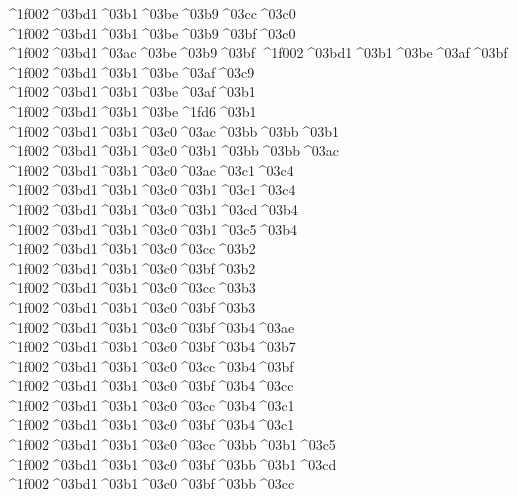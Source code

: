 {^^^^1f002^^^^03bd1^^^^03b1^^^^03be^^^^03b9^^^^03cc^^^^03c0  		%
^^^^1f002^^^^03bd1^^^^03b1^^^^03be^^^^03b9^^^^03bf^^^^03c0
^^^^1f002^^^^03bd1^^^^03ac^^^^03be^^^^03b9^^^^03bf 		%
^^^^1f002^^^^03bd1^^^^03b1^^^^03be^^^^03af^^^^03bf
^^^^1f002^^^^03bd1^^^^03b1^^^^03be^^^^03af^^^^03c9
^^^^1f002^^^^03bd1^^^^03b1^^^^03be^^^^03af^^^^03b1
^^^^1f002^^^^03bd1^^^^03b1^^^^03be^^^^1fd6^^^^03b1
^^^^1f002^^^^03bd1^^^^03b1^^^^03c0^^^^03ac^^^^03bb^^^^03bb^^^^03b1 		%
^^^^1f002^^^^03bd1^^^^03b1^^^^03c0^^^^03b1^^^^03bb^^^^03bb^^^^03ac
^^^^1f002^^^^03bd1^^^^03b1^^^^03c0^^^^03ac^^^^03c1^^^^03c4 		%
^^^^1f002^^^^03bd1^^^^03b1^^^^03c0^^^^03b1^^^^03c1^^^^03c4
^^^^1f002^^^^03bd1^^^^03b1^^^^03c0^^^^03b1^^^^03cd^^^^03b4 		%
^^^^1f002^^^^03bd1^^^^03b1^^^^03c0^^^^03b1^^^^03c5^^^^03b4
^^^^1f002^^^^03bd1^^^^03b1^^^^03c0^^^^03cc^^^^03b2 		%
^^^^1f002^^^^03bd1^^^^03b1^^^^03c0^^^^03bf^^^^03b2
^^^^1f002^^^^03bd1^^^^03b1^^^^03c0^^^^03cc^^^^03b3 		%
^^^^1f002^^^^03bd1^^^^03b1^^^^03c0^^^^03bf^^^^03b3
^^^^1f002^^^^03bd1^^^^03b1^^^^03c0^^^^03bf^^^^03b4^^^^03ae 		%
^^^^1f002^^^^03bd1^^^^03b1^^^^03c0^^^^03bf^^^^03b4^^^^03b7
^^^^1f002^^^^03bd1^^^^03b1^^^^03c0^^^^03cc^^^^03b4^^^^03bf 		%
^^^^1f002^^^^03bd1^^^^03b1^^^^03c0^^^^03bf^^^^03b4^^^^03cc
^^^^1f002^^^^03bd1^^^^03b1^^^^03c0^^^^03cc^^^^03b4^^^^03c1 		%
^^^^1f002^^^^03bd1^^^^03b1^^^^03c0^^^^03bf^^^^03b4^^^^03c1
^^^^1f002^^^^03bd1^^^^03b1^^^^03c0^^^^03cc^^^^03bb^^^^03b1^^^^03c5 		%
^^^^1f002^^^^03bd1^^^^03b1^^^^03c0^^^^03bf^^^^03bb^^^^03b1^^^^03cd
^^^^1f002^^^^03bd1^^^^03b1^^^^03c0^^^^03bf^^^^03bb^^^^03cc 		%
}
